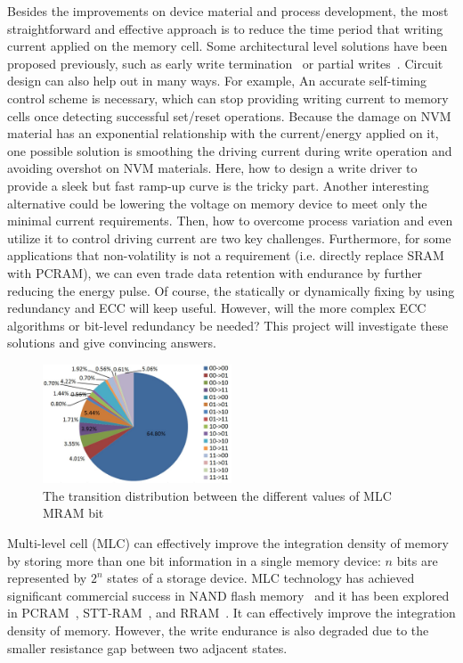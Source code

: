Besides the improvements on device material and process development, the most straightforward and effective approach is to reduce the time period that writing current applied on the memory cell. Some architectural level solutions have been proposed previously, such as early write termination~\cite{Zhou09} or partial writes~\cite{Lee09}. Circuit design can also help out in many ways. For example, An accurate self-timing control scheme is necessary, which can stop providing writing current to memory cells once detecting successful set/reset operations. Because the damage on NVM material has an exponential relationship with the current/energy applied on it, one possible solution is smoothing the driving current during write operation and avoiding overshot on NVM materials. Here, how to design a write driver to provide a sleek but fast ramp-up curve is the tricky part. Another interesting alternative could be lowering the voltage on memory device to meet only the minimal current requirements. Then, how to overcome process variation and even utilize it to control driving current are two key challenges. Furthermore, for some applications that non-volatility is not a requirement (i.e. directly replace SRAM with PCRAM), we can even trade data retention with endurance by further reducing the energy pulse. Of course, the statically or dynamically fixing by using redundancy and ECC will keep useful. However, will the more complex ECC algorithms or bit-level redundancy be needed? This project will investigate these solutions and give convincing answers.

\begin{figure}\centering \centering
\vspace{-18pt}
\includegraphics[width=0.5\textwidth]{./figure/mlc-tran.jpg}
\caption{The transition distribution between the different values of MLC MRAM bit}\label{mlc-tran}
\end{figure}

Multi-level cell (MLC) can effectively improve the integration density of memory by storing more than one bit information in a single memory device: $n$ bits are represented by  $2^n$ states of a storage device. MLC technology has achieved significant commercial success in NAND flash memory~\cite{Park04} and it has been explored in PCRAM~\cite{Raoux08,Bedeschi09}, STT-RAM~\cite{Lou08}, and RRAM~\cite{Baek05}. It can effectively improve the integration density of memory. However, the write endurance is also degraded due to the smaller resistance gap between two adjacent states.


